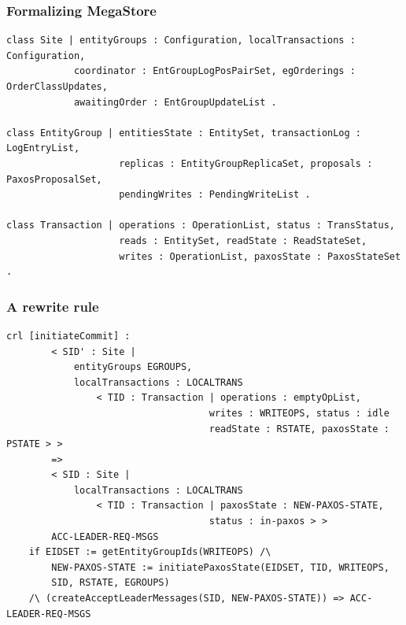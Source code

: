 \documentclass{beamer}
\begin{document}
\begin{frame}[fragile]   

    \frametitle{Formalizing MegaStore} 
    \scriptsize   
    \begin{lstlisting}[language=maude]
class Site | entityGroups : Configuration, localTransactions : Configuration,
            coordinator : EntGroupLogPosPairSet, egOrderings : OrderClassUpdates,
            awaitingOrder : EntGroupUpdateList .

class EntityGroup | entitiesState : EntitySet, transactionLog : LogEntryList,
                    replicas : EntityGroupReplicaSet, proposals : PaxosProposalSet,
                    pendingWrites : PendingWriteList .

class Transaction | operations : OperationList, status : TransStatus,
                    reads : EntitySet, readState : ReadStateSet,
                    writes : OperationList, paxosState : PaxosStateSet .
    \end{lstlisting}
\end{frame}
\begin{frame}[fragile]
    \frametitle{A rewrite rule}
    \scriptsize
    \begin{lstlisting}[language=maude]
    crl [initiateCommit] :
        < SID' : Site |
            entityGroups EGROUPS,
            localTransactions : LOCALTRANS
                < TID : Transaction | operations : emptyOpList,
                                    writes : WRITEOPS, status : idle
                                    readState : RSTATE, paxosState : PSTATE > >
        =>
        < SID : Site |
            localTransactions : LOCALTRANS
                < TID : Transaction | paxosState : NEW-PAXOS-STATE,
                                    status : in-paxos > >
        ACC-LEADER-REQ-MSGS
    if EIDSET := getEntityGroupIds(WRITEOPS) /\
        NEW-PAXOS-STATE := initiatePaxosState(EIDSET, TID, WRITEOPS,
        SID, RSTATE, EGROUPS)
    /\ (createAcceptLeaderMessages(SID, NEW-PAXOS-STATE)) => ACC-LEADER-REQ-MSGS
        \end{lstlisting}
\end{frame}
\end{document}
